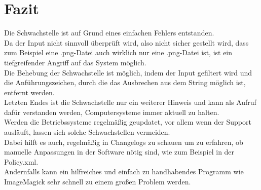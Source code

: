 \chapter{Fazit}\label{ch:fazit}

Die Schwachstelle ist auf Grund eines einfachen Fehlers entstanden.\\
Da der Input nicht sinnvoll überprüft wird, also nicht sicher gestellt wird, dass zum Beispiel eine .png-Datei auch wirklich nur eine .png-Datei ist, ist ein tiefgreifender Angriff auf das System möglich.\\

Die Behebung der Schwachstelle ist möglich, indem der Input gefiltert wird und die Anführungszeichen, durch die das Ausbrechen aus dem String möglich ist, entfernt werden.\\

Letzten Endes ist die Schwachstelle nur ein weiterer Hinweis und kann als Aufruf dafür verstanden werden, Computersysteme immer aktuell zu halten.\\
Werden die Betriebssysteme regelmäßig geupdatet, vor allem wenn der Support ausläuft, lassen sich solche Schwachstellen vermeiden.\\
Dabei hilft es auch, regelmäßig in Changelogs zu schauen um zu erfahren, ob manuelle Anpassungen in der Software nötig sind, wie zum Beispiel in der Policy.xml.\\

Andernfalls kann ein hilfreiches und einfach zu handhabendes Programm wie ImageMagick sehr schnell zu einem großen Problem werden.